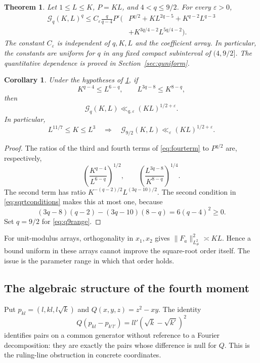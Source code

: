\documentclass[11pt,reqno]{amsart}
\numberwithin{equation}{section}
\newtheorem{theorem}{Theorem}[section]
\newtheorem{corollary}[corollary]{Corollary}
\theoremstyle{definition}
\theoremstyle{remark}
\newcommand{\eps}{\varepsilon}
\newcommand{\Gq}{\mathcal G_q}
\newcommand{\Gnine}{\mathcal G_{9/2}}
\begin{document}
\begin{theorem}\label{thm:first}
Let $1\le L\le K$, $P=KL$, and $4<q\le9/2$. For every $\eps>0$,
\begin{equation}\label{eq:fourterm}
 \begin{aligned}
 \Gq(K,L)^q\le C_\eps\frac{q}{q-4}P^\eps
 \bigl(&P^{q/2}+KL^{2q-5}+K^{q-2}L^{q-3}\\
       &+K^{3q/4-2}L^{5q/4-2}\bigr).
 \end{aligned}
\end{equation}
The constant $C_\eps$ is independent of $q,K,L$ and the coefficient array. In particular, the constants are uniform for $q$ in any fixed compact subinterval of $(4,9/2]$. The quantitative dependence is proved in Section~\ref{sec:quniform}.
\end{theorem}

\begin{corollary}\label{cor:sqrt}
Under the hypotheses of \cref{thm:first}, if
\begin{equation}\label{eq:sqrtconditions}
 K^{q-4}\le L^{6-q},\qquad L^{3q-8}\le K^{8-q},
\end{equation}
then
\begin{equation}\label{eq:sqrtbound}
 \Gq(K,L)\ll_{q,\eps}(KL)^{1/2+\eps}.
\end{equation}
In particular,
\begin{equation}\label{eq:q9range}
 L^{11/7}\le K\le L^3
 \quad\Longrightarrow\quad
 \Gnine(K,L)\ll_\eps(KL)^{1/2+\eps}.
\end{equation}
\end{corollary}
\begin{proof}
The ratios of the third and fourth terms of \eqref{eq:fourterm} to $P^{q/2}$ are, respectively,
\[
 \left(\frac{K^{q-4}}{L^{6-q}}\right)^{1/2},
 \qquad
 \left(\frac{L^{3q-8}}{K^{8-q}}\right)^{1/4}.
\]
The second term has ratio $K^{-(q-2)/2}L^{(3q-10)/2}$.
The second condition in \eqref{eq:sqrtconditions} makes this at most one, because
\[
 (3q-8)(q-2)-(3q-10)(8-q)=6(q-4)^2\ge0.
\]
Set $q=9/2$ for \eqref{eq:q9range}.
\end{proof}
For unit-modulus arrays, orthogonality in $x_1,x_2$ gives $\|F_a\|_{L^2_\#}^2\asymp KL$.
Hence a bound uniform in these arrays cannot improve the square-root order itself. The issue is the parameter range in which that order holds.

\subsection{The algebraic structure of the fourth moment}
Put $p_{kl}=(l,kl,l\sqrt{k})$ and $Q(x,y,z)=z^2-xy$. The identity
\begin{equation}\label{eq:introconeidentity}
 Q(p_{kl}-p_{k'l'})=ll'(\sqrt{k}-\sqrt{k'})^2
\end{equation}
identifies pairs on a common generator without reference to a Fourier decomposition:
they are exactly the pairs whose difference is null for $Q$.
This is the ruling-line obstruction in concrete coordinates.
\end{document}
